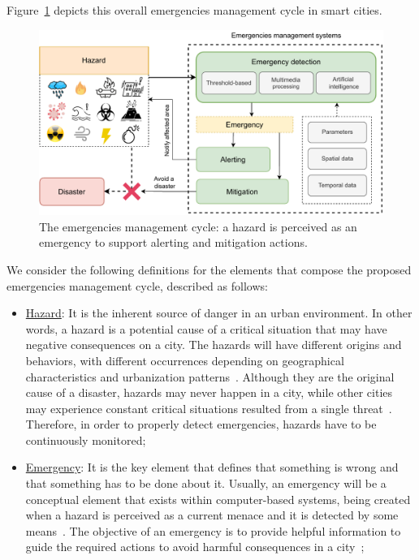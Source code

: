 \begin{refsection}
Figure~\ref{Fig:cycle} depicts this overall emergencies management cycle in smart cities. 

\begin{figure}[htbp]
  \centering
  \includegraphics[scale=0.85]{Chapters/2-Survey/images/newcycle.pdf}
  \caption{The emergencies management cycle: a hazard is perceived as an emergency to support alerting and mitigation actions.}\label{Fig:cycle}
\end{figure}

We consider the following definitions for the elements that compose the proposed emergencies management cycle, described as follows:

\begin{itemize}
  \item \underline{Hazard}: It is the inherent source of danger in an urban environment. In other words, a hazard is a potential cause of a critical situation that may have negative consequences on a city. The hazards will have different origins and behaviors, with different occurrences depending on geographical characteristics and urbanization patterns~\cite{hazard1,hazard2}. Although they are the original cause of a disaster, hazards may never happen in a city, while other cities may experience constant critical situations resulted from a single threat~\cite{hazard3}. Therefore, in order to properly detect emergencies, hazards have to be continuously monitored;
  
  \item \underline{Emergency}: It is the key element that defines that something is wrong and that something has to be done about it. Usually, an emergency will be a conceptual element that exists within computer-based systems, being created when a hazard is perceived as a current menace and it is detected by some means~\cite{socialmedia1,citiesdisasters1}. The objective of an emergency is to provide helpful information to guide the required actions to avoid harmful consequences in a city~\cite{emergenciesgeneral1};
  

\end{itemize}
\end{refsection}
